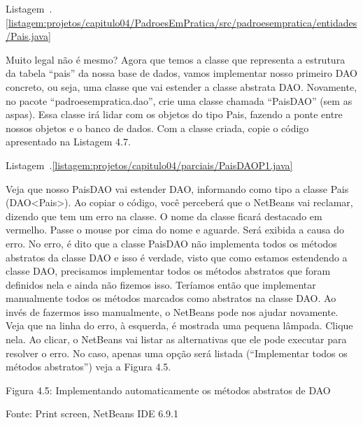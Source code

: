 Listagem~\thechapter.\ref{listagem:projetos/capitulo04/PadroesEmPratica/src/padroesempratica/entidades/Pais.java}

Muito legal não é mesmo? Agora que temos a classe que representa a estrutura da tabela ``pais'' da nossa base de dados, vamos implementar nosso primeiro DAO concreto, ou seja, uma classe que vai estender a classe abstrata DAO. Novamente, no pacote ``padroesempratica.dao'', crie uma classe chamada ``PaisDAO'' (sem as aspas). Essa classe irá lidar com os objetos do tipo Pais, fazendo a ponte entre nossos objetos e o banco de dados. Com a classe criada, copie o código apresentado na Listagem 4.7.

Listagem~\thechapter.\ref{listagem:projetos/capitulo04/parciais/PaisDAOP1.java}

Veja que nosso PaisDAO vai estender DAO, informando como tipo a classe Pais (DAO<Pais>). Ao copiar o código, você perceberá que o NetBeans vai reclamar, dizendo que tem um erro na classe. O nome da classe ficará destacado em vermelho. Passe o mouse por cima do nome e aguarde. Será exibida a causa do erro. No erro, é dito que a classe PaisDAO não implementa todos os métodos abstratos da classe DAO e isso é verdade, visto que como estamos estendendo a classe DAO, precisamos implementar todos os métodos abstratos que foram definidos nela e ainda não fizemos isso. Teríamos então que implementar manualmente todos os métodos marcados como abstratos na classe DAO. Ao invés de fazermos isso manualmente, o NetBeans pode nos ajudar novamente. Veja que na linha do erro, à esquerda, é mostrada uma pequena lâmpada. Clique nela. Ao clicar, o NetBeans vai listar as alternativas que ele pode executar para resolver o erro. No caso, apenas uma opção será listada (``Implementar todos os métodos abstratos'') veja a Figura 4.5.

Figura 4.5: Implementando automaticamente os métodos abstratos de DAO
 
Fonte: Print screen, NetBeans IDE 6.9.1

